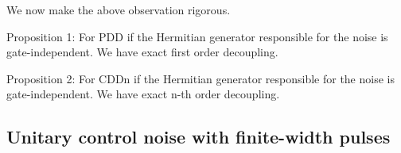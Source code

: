 \documentclass[b5paper,11pt]{article}
\begin{document}
We now make the above observation rigorous. 

Proposition 1: For PDD if the Hermitian generator responsible for the noise is gate-independent. We have exact first order decoupling. 

Proposition 2: For CDDn if the Hermitian generator responsible for the noise is gate-independent. We have exact n-th order decoupling. 

\subsection{Unitary control noise with finite-width pulses}

\end{document}
